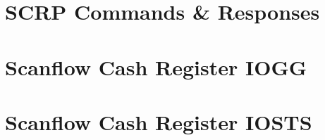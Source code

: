   \newpage
  \chapter{SCRP Commands \& Responses}\label{app:scrp-specification}
  

  \newpage
  \chapter{Scanflow Cash Register IOGG}\label{app:scrp-gg}
  

  \newpage
  \chapter{Scanflow Cash Register IOSTS}\label{app:scrp-sts}
  